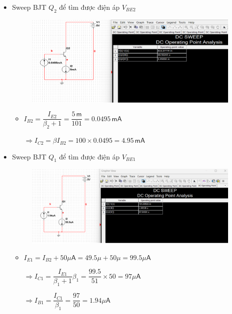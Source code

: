 \begin{itemize}[label=-]
	\item Sweep BJT $Q_{2}$ để tìm được điện áp $V_{BE2}$
	
	\begin{figure}[H]
		\centering
		\includegraphics[width=.8\linewidth]{./my-chapters/my-images/Question7/a_quetVbe_q2.png}
	\end{figure} 
	
	\begin{itemize}[label=-, leftmargin=1cm]
		\item $I_{B2} = \dfrac{I_{E2}}{\beta_{2} + 1} = \dfrac{5\,\textsf{m}}{101} = 0.0495\,\textsf{mA}$
		
		$\Rightarrow I_{C2} = \beta I_{B2} = 100\times 0.0495 = 4.95\,\textsf{mA}$
	\end{itemize}
	
	\item Sweep BJT $Q_{1}$ để tìm được điện áp $V_{BE1}$
	
	\begin{figure}[H]
		\centering
		\includegraphics[width=.8\linewidth]{./my-chapters/my-images/Question7/a_quetVbe.png}
	\end{figure} 
	
	\begin{itemize}[label=-, leftmargin=1cm]
		\item $I_{E1} = I_{B2} + 50\mu\textsf{A} = 49.5\mu + 50\mu = 99.5\mu\textsf{A}$
		
		$\Rightarrow I_{C1} = \dfrac{I_{E1}}{\beta_{1} + 1}\beta_{1} = \dfrac{99.5}{51}\times 50 = 97\mu\textsf{A}$
		
		$\Rightarrow I_{B1} = \dfrac{I_{C1}}{\beta_{1}} = \dfrac{97}{50} = 1.94\mu\textsf{A}$
	\end{itemize}
\end{itemize}

